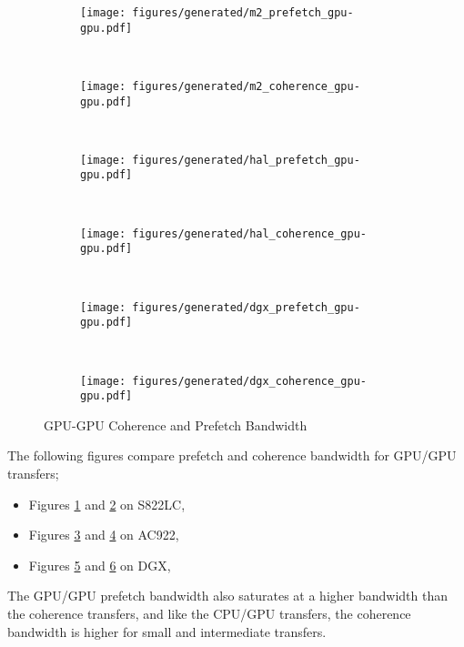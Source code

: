 \begin{figure}[ht]
	\centering
	\begin{subfigure}[b]{0.45\textwidth}
		\texttt{[image: figures/generated/m2\_prefetch\_gpu-gpu.pdf]}
		\caption{}
		\label{fig:um-prefetch-s822lc-gpu-gpu}
	\end{subfigure}
	~
	\begin{subfigure}[b]{0.45\textwidth}
		\texttt{[image: figures/generated/m2\_coherence\_gpu-gpu.pdf]}
		\caption{}
		\label{fig:um-coherence-s822lc-gpu-gpu}
	\end{subfigure}
	\\
	\begin{subfigure}[b]{0.45\textwidth}
		\texttt{[image: figures/generated/hal\_prefetch\_gpu-gpu.pdf]}
		\caption{}
		\label{fig:um-prefetch-ac922-gpu-gpu}
	\end{subfigure}
	~
	\begin{subfigure}[b]{0.45\textwidth}
		\texttt{[image: figures/generated/hal\_coherence\_gpu-gpu.pdf]}
		\caption{}
		\label{fig:um-coherence-ac922-gpu-gpu}
	\end{subfigure}
	\\
	\begin{subfigure}[b]{0.45\textwidth}
		\texttt{[image: figures/generated/dgx\_prefetch\_gpu-gpu.pdf]}
		\caption{}
		\label{fig:um-prefetch-dgx-gpu-gpu}
	\end{subfigure}
	~
	\begin{subfigure}[b]{0.45\textwidth}
		\texttt{[image: figures/generated/dgx\_coherence\_gpu-gpu.pdf]}
		\caption{}
		\label{fig:um-coherence-dgx-gpu-gpu}
	\end{subfigure}
	\caption[]{
		GPU-GPU Coherence and Prefetch Bandwidth
	}
	\label{fig:um-coherence-gpu-gpu}
\end{figure}


The following figures compare prefetch and coherence bandwidth for GPU/GPU transfers;
\begin{itemize}
	\item Figures \ref{fig:um-prefetch-s822lc-gpu-gpu} and \ref{fig:um-coherence-s822lc-gpu-gpu} on S822LC,
	\item Figures \ref{fig:um-prefetch-ac922-gpu-gpu} and \ref{fig:um-coherence-ac922-gpu-gpu}   on AC922,
	\item Figures \ref{fig:um-prefetch-dgx-gpu-gpu} and \ref{fig:um-coherence-dgx-gpu-gpu}       on DGX,
\end{itemize}
The GPU/GPU prefetch bandwidth also saturates at a higher bandwidth than the coherence transfers, and like the CPU/GPU transfers, the coherence bandwidth is higher for small and intermediate transfers.

